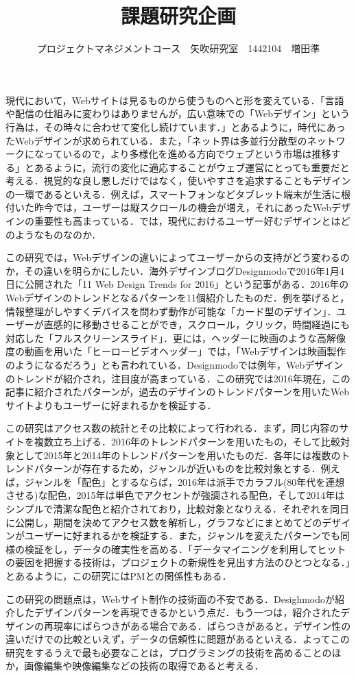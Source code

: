 \documentclass[uplatex,twocolumn,dvipdfmx]{jsarticle}
\title{\vspace{-5mm}\fontsize{14pt}{0pt}\selectfont 課題研究企画}
\author{\normalsize プロジェクトマネジメントコース　矢吹研究室　1442104　増田準}
\date{}
\begin{document}
\fontsize{10.5pt}{\baselineskip}\selectfont
\maketitle





現代において，Webサイトは見るものから使うものへと形を変えている．「言語や配信の仕組みに変わりはありませんが，広い意味での「Webデザイン」という行為は，その時々に合わせて変化し続けています．\cite{bib001}」とあるように，時代にあったWebデザインが求められている．また，「ネット界は多並行分散型のネットワークになっているので，より多様化を進める方向でウェブという市場は推移する\cite{bib002}」とあるように，流行の変化に適応することがウェブ運営にとっても重要だと考える．視覚的な良し悪しだけではなく，使いやすさを追求することもデザインの一環であるといえる．例えば，スマートフォンなどタブレット端末が生活に根付いた昨今では，ユーザーは縦スクロールの機会が増え，それにあったWebデザインの重要性も高まっている．では，現代におけるユーザー好むデザインとはどのようなものなのか．

この研究では，Webデザインの違いによってユーザーからの支持がどう変わるのか，その違いを明らかにしたい．海外デザインブログDesignmodoで2016年1月4日に公開された「11 Web Design Trends for 2016\cite{bib004}」という記事がある．2016年のWebデザインのトレンドとなるパターンを11個紹介したものだ．例を挙げると，情報整理がしやすくデバイスを問わず動作が可能な「カード型のデザイン」．ユーザーが直感的に移動させることができ，スクロール，クリック，時間経過にも対応した「フルスクリーンスライド」．更には，ヘッダーに映画のような高解像度の動画を用いた「ヒーロービデオヘッダー」では，「Webデザインは映画製作のようになるだろう」とも言われている．Designmodoでは例年，Webデザインのトレンドが紹介され，注目度が高まっている．この研究では2016年現在，この記事に紹介されたパターンが，過去のデザインのトレンドパターンを用いたWebサイトよりもユーザーに好まれるかを検証する．

この研究はアクセス数の統計とその比較によって行われる．まず，同じ内容のサイトを複数立ち上げる．2016年のトレンドパターンを用いたもの，そして比較対象として2015年と2014年のトレンドパターンを用いたものだ．各年には複数のトレンドパターンが存在するため，ジャンルが近いものを比較対象とする．例えば，ジャンルを「配色」とするならば，2016年は派手でカラフル(80年代を連想させる)な配色，2015年は単色でアクセントが強調される配色，そして2014年はシンプルで清潔な配色と紹介されており，比較対象となりえる．それぞれを同日に公開し，期間を決めてアクセス数を解析し，グラフなどにまとめてどのデザインがユーザーに好まれるかを検証する．また，ジャンルを変えたパターンでも同様の検証をし，データの確実性を高める．「データマイニングを利用してヒットの要因を把握する技術は，プロジェクトの新規性を見出す方法のひとつとなる．\cite{bib003}」とあるように，この研究にはPMとの関係性もある．

この研究の問題点は，Webサイト制作の技術面の不安である．Desighmodoが紹介したデザインパターンを再現できるかという点だ．もう一つは，紹介されたデザインの再現率にばらつきがある場合である．ばらつきがあると，デザイン性の違いだけでの比較といえず，データの信頼性に問題があるといえる．よってこの研究をするうえで最も必要なことは，プログラミングの技術を高めることのほか，画像編集や映像編集などの技術の取得であると考える．



\end{document}
